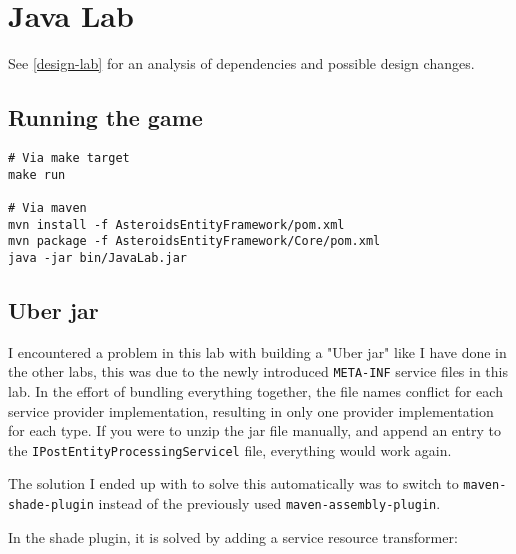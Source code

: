 \section{Java Lab}

See \ref{design-lab} for an analysis of dependencies and possible design
changes.

\subsection{Running the game}
\begin{verbatim}
# Via make target
make run

# Via maven
mvn install -f AsteroidsEntityFramework/pom.xml
mvn package -f AsteroidsEntityFramework/Core/pom.xml
java -jar bin/JavaLab.jar
\end{verbatim}

\subsection{Uber jar} \label{java-lab:uberjar}
I encountered a problem in this lab with building a "Uber jar" like I have done
in the other labs, this was due to the newly introduced \texttt{META-INF}
service files in this lab. In the effort of bundling everything together, the
file names conflict for each service provider implementation, resulting in only
one provider implementation for each type. If you were to unzip the jar file
manually, and append an entry to the \texttt{IPostEntityProcessingServicel} file,
everything would work again.

The solution I ended up with to solve this automatically was to switch to
\texttt{maven-shade-plugin} instead of the previously used
\texttt{maven-assembly-plugin}.

In the shade plugin, it is solved by adding a service resource transformer:
\inputminted{xml}{code/maven-shade.xml}

